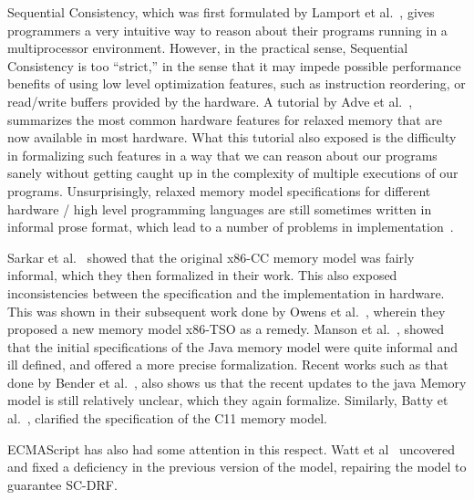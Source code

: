 
Sequential Consistency, which was first formulated by Lamport et al.~\cite{Lamport79}, gives programmers a very intuitive way to reason about their programs running in a multiprocessor environment.
However, in the practical sense, Sequential Consistency is too ``strict,'' in the sense that it may impede possible performance benefits of using low level optimization features, such as instruction reordering, or read/write buffers provided by the hardware.
A tutorial by Adve et al.~\cite{AdveG}, summarizes the most common hardware features for relaxed memory that are now available in most hardware. 
What this tutorial also exposed is the difficulty in formalizing such features in a way that we can reason about our programs sanely without getting caught up in the complexity of multiple executions of our programs. 
Unsurprisingly, relaxed memory model specifications for different hardware / high level programming languages are still sometimes written in informal prose format, which lead to a number of problems in implementation~\cite{Sewell}. 

Sarkar et al.~\cite{SarkarS} showed that the original x86-CC memory model was fairly informal, which they then formalized in their work. This also exposed inconsistencies between the specification and the implementation in hardware. This was shown in their subsequent work done by Owens et al.~\cite{OwensS}, wherein they proposed a new memory model x86-TSO as a remedy. 
Manson et al.~\cite{JeremyM}, showed that the initial specifications of the Java memory model were quite informal and ill defined, and offered a more precise formalization. Recent works such as that done by Bender et al.~\cite{BenderJ}, also shows us that the recent updates to the java Memory model is still relatively unclear, which they again formalize. 
Similarly, Batty et al.~\cite{BattyM}, clarified the specification of the C11 memory model. 


ECMAScript has also had some attention in this respect. Watt et al~\cite{WattC} uncovered and fixed a deficiency in the previous version of the model, repairing the model to guarantee SC-DRF.

